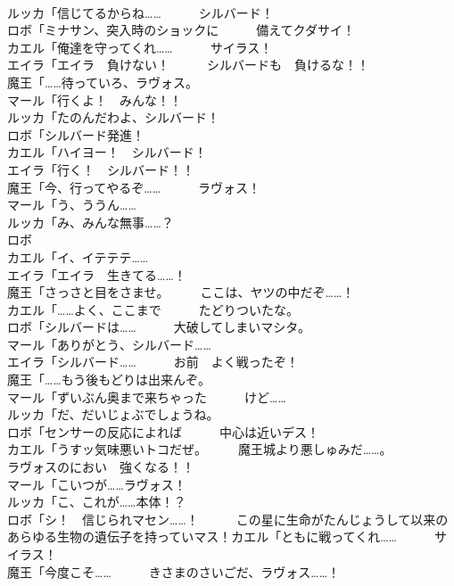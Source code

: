 \documentclass[8pt]{extreport}
\begin{document}
\begin{CJK}{UTF8}{min}
\\	ルッカ「信じてるからね……　　　シルバード！	
\\	ロボ「ミナサン、突入時のショックに　　　備えてクダサイ！	
\\	カエル「俺達を守ってくれ……　　　サイラス！	
\\	エイラ「エイラ　負けない！　　　シルバードも　負けるな！！	
\\	魔王「……待っていろ、ラヴォス。	
\\	マール「行くよ！　みんな！！	
\\	ルッカ「たのんだわよ、シルバード！	
\\	ロボ「シルバード発進！	
\\	カエル「ハイヨー！　シルバード！	
\\	エイラ「行く！　シルバード！！	
\\	魔王「今、行ってやるぞ……　　　ラヴォス！	
\\	マール「う、ううん……	
\\	ルッカ「み、みんな無事……？	
\\	ロボ
\\	カエル「イ、イテテテ……	
\\	エイラ「エイラ　生きてる……！	
\\	魔王「さっさと目をさませ。　　　ここは、ヤツの中だぞ……！	
\\	カエル「……よく、ここまで　　　たどりついたな。	
\\	ロボ「シルバードは……　　　大破してしまいマシタ。	
\\	マール「ありがとう、シルバード……	
\\	エイラ「シルバード……　　　お前　よく戦ったぞ！	
\\	魔王「……もう後もどりは出来んぞ。	
\\	マール「ずいぶん奥まで来ちゃった　　　けど……	
\\	ルッカ「だ、だいじょぶでしょうね。	
\\	ロボ「センサーの反応によれば　　　中心は近いデス！	
\\	カエル「うすッ気味悪いトコだぜ。　　　魔王城より悪しゅみだ……。	
\\	ラヴォスのにおい　強くなる！！	
\\	マール「こいつが……ラヴォス！	
\\	ルッカ「こ、これが……本体！？	
\\	ロボ「シ！　信じられマセン……！　　　この星に生命がたんじょうして以来の　　　あらゆる生物の遺伝子を持っていマス！カエル「ともに戦ってくれ……　　　サイラス！	
\\	魔王「今度こそ……　　　きさまのさいごだ、ラヴォス……！	

\end{CJK}
\end{document}
